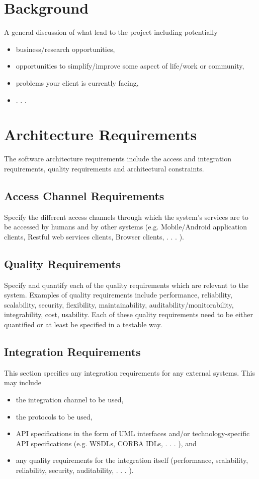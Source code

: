 \documentclass[a4paper,12pt]{article}
\begin{document}
\section{Background}

A general discussion of what lead to the project including potentially
\begin{itemize}
\item business/research opportunities,
\item opportunities to simplify/improve some aspect of life/work or community,
\item problems your client is currently facing,
\item . . .
\end{itemize}

\section{Architecture Requirements}

The software architecture requirements include the access and integration requirements, quality
requirements and architectural constraints.

\subsection{Access Channel Requirements}

Specify the different access channels through which the system's services are to be accessed by
humans and by other systems (e.g. Mobile/Android application clients, Restful web services
clients, Browser clients, . . . ).

\subsection{Quality Requirements}

Specify and quantify each of the quality requirements which are relevant to the system. Examples of quality requirements include performance, reliability, scalability, security, 
flexibility,
maintainability, auditability/monitorability, integrability, cost, usability. Each of these quality
requirements need to be either quantified or at least be specified in a testable way.

\subsection{Integration Requirements}

This section specifies any integration requirements for any external systems. This may include
\begin{itemize}
\item the integration channel to be used,
\item the protocols to be used,
\item API specifications in the form of UML interfaces and/or technology-specific API specifications (e.g. WSDLs, CORBA IDLs, . . . ), and
\item any quality requirements for the integration itself (performance, scalability, reliability, security, auditability, . . . ).
\end{itemize}
\end{document}
